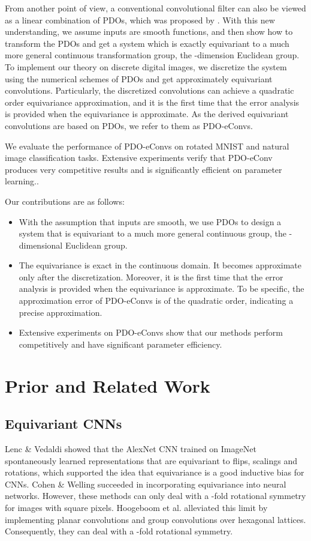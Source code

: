 \documentclass{article}
\begin{document}
From another point of view, a conventional convolutional filter can also be viewed as a linear combination of PDOs, which was proposed by \cite{ruthotto2018deep}. With this new understanding, we assume inputs are smooth functions, and then show how to transform the PDOs and get a system which is exactly equivariant to a much more general continuous transformation group, the -dimension Euclidean group. To implement our theory on discrete digital images, we discretize the system using the numerical schemes of PDOs and get approximately equivariant convolutions. Particularly, the discretized convolutions can achieve a quadratic order equivariance approximation, and it is the first time that the error analysis is provided when the equivariance is approximate. As the derived equivariant convolutions are based on PDOs, we refer to them as PDO-eConvs.

We evaluate the performance of PDO-eConvs on rotated MNIST and natural image classification tasks. Extensive experiments verify that PDO-eConv produces very competitive results and is significantly efficient on parameter learning.. 

Our contributions are as follows:

\begin{itemize}
	\item With the assumption that inputs are smooth, we use PDOs to design a system that is equivariant to a much more general continuous group, the -dimensional Euclidean group.
	\item The equivariance is exact in the continuous domain. It becomes approximate only after the discretization. Moreover, it is the first time that the error analysis is provided when the equivariance is approximate. To be specific, the approximation error of PDO-eConvs is of the quadratic order, indicating a precise approximation.
	\item Extensive experiments on PDO-eConvs show that our methods perform competitively and have significant parameter efficiency. 
\end{itemize}

\section{Prior and Related Work}
\subsection{Equivariant CNNs}

Lenc \& Vedaldi  showed that the AlexNet CNN \cite{krizhevsky2012imagenet} trained on ImageNet spontaneously learned representations that are equivariant to flips, scalings and rotations, which supported the idea that equivariance is a good inductive bias for CNNs. Cohen \& Welling  succeeded in incorporating equivariance into neural networks. However, these methods can only deal with a -fold rotational symmetry for images with square pixels. Hoogeboom et al.  alleviated this limit by implementing planar convolutions and group convolutions over hexagonal lattices. Consequently, they can deal with a -fold rotational symmetry.
\end{document}
